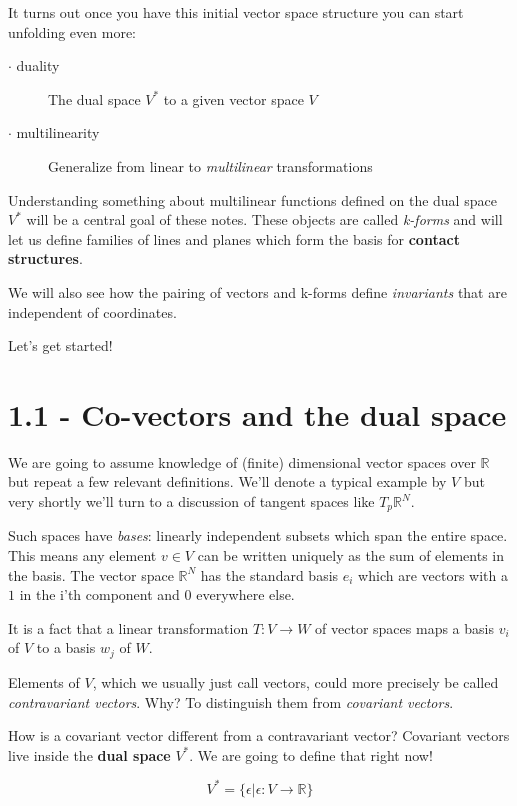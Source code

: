 \documentclass{article}
\begin{document}
It turns out once you have this initial vector space structure you can start
unfolding even more:

\begin{description}
\item[$\cdot$ duality       ] The dual space $V^{*}$ to a given vector space $V$
\item[$\cdot$ multilinearity] Generalize from linear to \textsl{multilinear} transformations 
\end{description}

Understanding something about multilinear functions defined on the dual space
$V^{*}$ will be a central goal of these notes. These objects are called
\textsl{k-forms} and will let us define families of lines and planes which form
the basis for \textbf{contact structures}.

We will also see how the pairing of vectors and k-forms define
\textsl{invariants} that are independent of coordinates.

Let's get started!

\section* {1.1 - Co-vectors and the dual space}

We are going to assume knowledge of (finite) dimensional vector spaces over
$\mathbb{R}$ but repeat a few relevant definitions. We'll
denote a typical example by $V$ but very shortly we'll turn to a discussion of
tangent spaces like $T_{p}\mathbb{R}^{N}$.

Such spaces have \textsl{bases}: linearly independent subsets which span the
entire space. This means any element $v \in V$ can be written uniquely as the
sum of elements in the basis. The vector space $\mathbb{R}^{N}$ has the standard basis $e_{i}$
which are vectors with a $1$ in the i'th component and $0$ everywhere else.

It is a fact that a linear transformation $T : V \to W$ of vector spaces maps a
basis $v_{i}$ of $V$ to a basis $w_{j}$ of $W$.

Elements of $V$, which we usually just call vectors, could more precisely be
called \textsl{contravariant vectors}. Why? To distinguish them from
\textsl{covariant vectors}.

How is a covariant vector different from a contravariant vector? Covariant
vectors live inside the \textbf{dual space} $V^{*}$. We are going to define that
right now!

\[ V^{*} = \{ \epsilon | \epsilon : V \to \mathbb{R} \} \]
\end{document}
